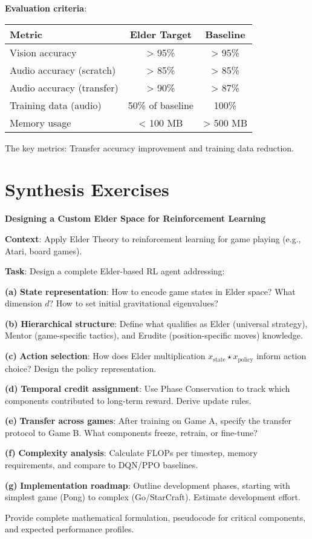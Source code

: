 \begin{coding}
\textbf{Evaluation criteria}:
\begin{center}
\begin{tabular}{|l|c|c|}
\hline
Metric & Elder Target & Baseline \\
\hline
Vision accuracy & > 95\% & > 95\% \\
Audio accuracy (scratch) & > 85\% & > 85\% \\
Audio accuracy (transfer) & > 90\% & > 87\% \\
Training data (audio) & 50\% of baseline & 100\% \\
Memory usage & < 100 MB & > 500 MB \\
\hline
\end{tabular}
\end{center}

The key metrics: Transfer accuracy improvement and training data reduction.
\end{coding}

\section{Synthesis Exercises}

\begin{challenge}
\textbf{Designing a Custom Elder Space for Reinforcement Learning}

\textbf{Context}: Apply Elder Theory to reinforcement learning for game playing (e.g., Atari, board games).

\textbf{Task}: Design a complete Elder-based RL agent addressing:

\textbf{(a)} \textbf{State representation}: How to encode game states in Elder space? What dimension $d$? How to set initial gravitational eigenvalues?

\textbf{(b)} \textbf{Hierarchical structure}: Define what qualifies as Elder (universal strategy), Mentor (game-specific tactics), and Erudite (position-specific moves) knowledge.

\textbf{(c)} \textbf{Action selection}: How does Elder multiplication $x_{\text{state}} \star x_{\text{policy}}$ inform action choice? Design the policy representation.

\textbf{(d)} \textbf{Temporal credit assignment}: Use Phase Conservation to track which components contributed to long-term reward. Derive update rules.

\textbf{(e)} \textbf{Transfer across games}: After training on Game A, specify the transfer protocol to Game B. What components freeze, retrain, or fine-tune?

\textbf{(f)} \textbf{Complexity analysis}: Calculate FLOPs per timestep, memory requirements, and compare to DQN/PPO baselines.

\textbf{(g)} \textbf{Implementation roadmap}: Outline development phases, starting with simplest game (Pong) to complex (Go/StarCraft). Estimate development effort.

Provide complete mathematical formulation, pseudocode for critical components, and expected performance profiles.
\end{challenge}

